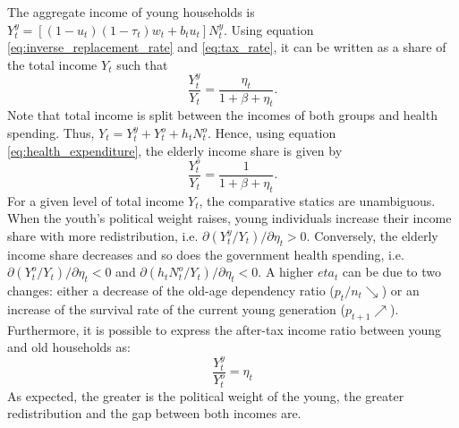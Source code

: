 The aggregate income of young households is $Y_t^y = \left[(1-u_t)(1-\tau_t)w_t+b_tu_t\right]N_t^y$. Using equation \eqref{eq:inverse_replacement_rate} and \eqref{eq:tax_rate}, it can be written as a share of the total income $Y_t$ such that
	\begin{equation*}
		\frac{Y_t^y}{Y_t} = \frac{\eta_t}{1+\beta+\eta_t}.
	\end{equation*}
Note that total income is split between the incomes of both groups and health spending. Thus, $Y_t = Y_t^y + Y_t^o + h_tN_t^o$. Hence, using equation \eqref{eq:health_expenditure}, the elderly income share is given by
	\begin{equation*}
	\frac{Y_t^o}{Y_t} = \frac{1}{1+\beta+\eta_t}.
	\end{equation*}
For a given level of total income $Y_t$, the comparative statics are unambiguous. When the youth's political weight raises, young individuals increase their income share with more redistribution, i.e. $\partial(Y_t^y/Y_t)/\partial\eta_t>0$. Conversely, the elderly income share decreases and so does the government health spending, i.e. $\partial (Y_t^o/Y_t)/\partial\eta_t<0$ and $\partial(h_tN_t^o/Y_t)/\partial\eta_t<0$. A higher $eta_t$ can be due to two changes: either a decrease of the old-age dependency ratio ($p_t/n_t \searrow$) or an increase of the survival rate of the current young generation ($p_{t+1} \nearrow$).
Furthermore, it is possible to express the after-tax income ratio between young and old households as:
	\begin{equation} \label{eq:after_tax_income_ratio}
		\frac{Y_t^y}{Y_t^o} = \eta_t
	\end{equation}
As expected, the greater is the political weight of the young, the greater redistribution and the gap between both incomes are.

